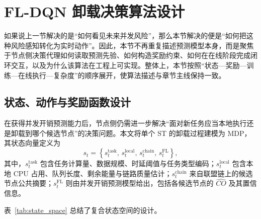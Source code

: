 \section{FL-DQN 卸载决策算法设计}
\label{sec:dqn_policy}
如果说上一节解决的是“如何看见未来并发风险”，那么本节解决的便是“如何把这种风险感知转化为实时动作”。因此，本节不再重复描述预测模型本身，而是聚焦于节点侧决策代理如何读取预测先验、如何构造奖励约束、如何在在线阶段完成闭环交互，以及为什么该算法在工程上可实现。整体上，本节按照“状态—奖励—训练—在线执行—复杂度”的顺序展开，使算法描述与章节主线保持一致。


\subsection{状态、动作与奖励函数设计}

在获得并发开销预测能力后，节点侧仍需进一步解决“面对新任务应当本地执行还是卸载到哪个候选节点”的决策问题。本文将单个 ST 的卸载过程建模为 MDP，其状态向量定义为
\begin{equation}
s_t =
\left\{
s_t^{\mathrm{task}},\,
s_t^{\mathrm{local}},\,
s_t^{\mathrm{chain}},\,
s_t^{\mathrm{FL}}
\right\},
\label{eq:dqn_state}
\end{equation}
其中，$s_t^{\mathrm{task}}$ 包含任务计算量、数据规模、时延阈值与任务类型编码；$s_t^{\mathrm{local}}$ 包含本地 CPU 占用、队列长度、剩余能量与链路质量估计；$s_t^{\mathrm{chain}}$ 来自联盟链上的候选节点公共摘要；$s_t^{\mathrm{FL}}$ 则由并发开销预测模型给出，包括各候选节点的 $\widehat{CO}$ 及其置信信息。

表~\ref{tab:state_space} 总结了复合状态空间的设计。

\begin{table}[H]
\centering
\footnotesize
\caption{节点侧决策的复合状态空间设计}
\label{tab:state_space}
\setlength{\tabcolsep}{2.0mm}
\renewcommand{\arraystretch}{1.15}
\end{table}

